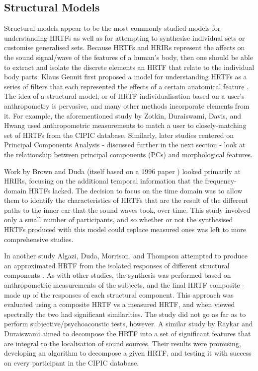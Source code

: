 \subsection{Structural Models}
Structural models appear to be the most commonly studied models for understanding HRTFs as well as for attempting to synthesise individual sets or customise generalised sets\citep{Brown1998}.  Because HRTFs and HRIRs represent the affects on the sound signal/wave of the features of a human's body, then one should be able to extract and isolate the discrete elements an HRTF that relate to the individual body parts. Klaus Genuit first proposed a model for understanding HRTFs as a series of filters that each represented the effects of a certain anatomical feature \citep{Genuit1984}. The idea of a structural model, or of HRTF individualisation based on a user's anthropometry is pervasive, and many other methods incorporate elements from it. For example, the aforementioned study by Zotkin, Duraiswami, Davis, and Hwang \citep{Duraiswami2003} used anthropometric measurements to match a user to closely-matching set of HRTFs from the CIPIC database. Similarly, later studies centered on Principal Components Analysis - discussed further in the next section - look at the relationship between principal components (PCs) and morphological features. 

Work by Brown and Duda \citep{Brown1998} (itself based on a 1996 paper \citep{lopexmeddis1996}) looked primarily at HRIRs, focusing on the additional temporal information that the frequency-domain HRTFs lacked. The decision to focus on the time domain was to allow them to identify the characteristics of HRTFs that are the result of the different paths to the inner ear that the sound waves took, over time. This study involved only a small number of participants, and so whether or not the synthesised HRTFs produced with this model could replace measured ones was left to more comprehensive studies. 

In another study Algazi, Duda, Morrison, and Thompson attempted to produce an approximated HRTF from the isolated responses of different structural components \citep{Algazi2001}. As with other studies, the synthesis was performed based on anthropometric measurements of the subjects, and the final HRTF composite - made up of the responses of each structural component. This approach was evaluated using a composite HRTF vs a measured HRTF, and when viewed spectrally the two had significant similarities. The study did not go as far as to perform subjective/psychoacoustic tests, however. A similar study by Raykar and Duraiswami \citep{Raykar2004} aimed to decompose the HRTF into a set of significant features that are integral to the localisation of sound sources. Their results were promising, developing an algorithm to decompose a given HRTF, and testing it with success on every participant in the CIPIC database. 

